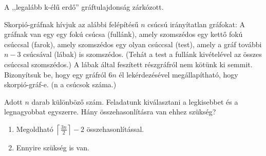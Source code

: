 \begin{Exercise}[counter={sorszam}, difficulty=0]
A ,,legalább k-élű erdő'' gráftulajdonság zárkózott.
\end{Exercise}


\begin{Exercise}[counter={sorszam}, difficulty=0]
Skorpió-gráfnak hívjuk az alábbi felépítésű $n$ csúcsú irányítatlan gráfokat: A gráfnak van egy egy fokú csúcsa (fullánk), amely szomszédos egy kettő fokú csúccsal (farok), amely szomszédos egy olyan csúccsal (test), amely a gráf további $n-3$ csúcsával (lábak) is szomszédos. (Tehát a test a fullánk kivételével az összes csúccsal szomszédos.) A lábak által feszített részgráfról nem kötünk ki semmit.  Bizonyítsuk be, hogy egy gráfról $6n$ él lekérdezésével megállapítható, hogy skorpió-gráf-e. (n a csúcsok száma.)

\end{Exercise}


\begin{Exercise}[counter={sorszam}, difficulty=0]
Adott $n$ darab különböző szám. Feladatunk kiválasztani a legkisebbet és a
legnagyobbat egyszerre. Hány összehasonlításra van ehhez szükség?

\begin{enumerate}
  \item Megoldható $\left \lceil \frac{3n}{2} \right \rceil - 2$ összehasonlítással.
  \item \hard Ennyire szükség is van.
\end{enumerate}
\end{Exercise}


